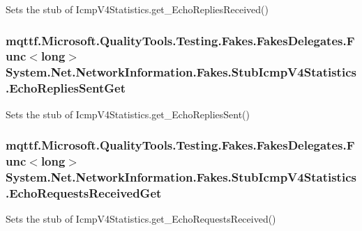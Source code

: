 Sets the stub of Icmp\-V4\-Statistics.\-get\-\_\-\-Echo\-Replies\-Received()

\hypertarget{class_system_1_1_net_1_1_network_information_1_1_fakes_1_1_stub_icmp_v4_statistics_acf399e3f97f88ed5b56f0ee4f8e3b179}{
\subsubsection[{Echo\-Replies\-Sent\-Get}]{\setlength{\rightskip}{0pt plus 5cm}mqttf.\-Microsoft.\-Quality\-Tools.\-Testing.\-Fakes.\-Fakes\-Delegates.\-Func$<$long$>$ System.\-Net.\-Network\-Information.\-Fakes.\-Stub\-Icmp\-V4\-Statistics.\-Echo\-Replies\-Sent\-Get}}\label{class_system_1_1_net_1_1_network_information_1_1_fakes_1_1_stub_icmp_v4_statistics_acf399e3f97f88ed5b56f0ee4f8e3b179}


Sets the stub of Icmp\-V4\-Statistics.\-get\-\_\-\-Echo\-Replies\-Sent()

\hypertarget{class_system_1_1_net_1_1_network_information_1_1_fakes_1_1_stub_icmp_v4_statistics_accb5a67fcab24ce6d617acf3aaf2f31d}{
\subsubsection[{Echo\-Requests\-Received\-Get}]{\setlength{\rightskip}{0pt plus 5cm}mqttf.\-Microsoft.\-Quality\-Tools.\-Testing.\-Fakes.\-Fakes\-Delegates.\-Func$<$long$>$ System.\-Net.\-Network\-Information.\-Fakes.\-Stub\-Icmp\-V4\-Statistics.\-Echo\-Requests\-Received\-Get}}\label{class_system_1_1_net_1_1_network_information_1_1_fakes_1_1_stub_icmp_v4_statistics_accb5a67fcab24ce6d617acf3aaf2f31d}


Sets the stub of Icmp\-V4\-Statistics.\-get\-\_\-\-Echo\-Requests\-Received()

